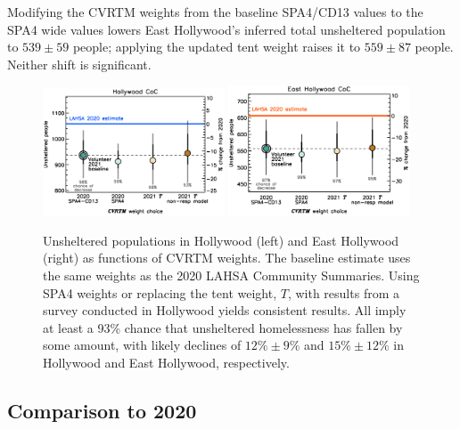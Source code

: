 \documentclass[11pt,twocolumn]{article}
\def\resp{respectively}
\begin{document}
Modifying the CVRTM weights from the baseline SPA4/CD13 values to the SPA4 wide values 
lowers East Hollywood's inferred total unsheltered population to $539\pm59$ people; applying
the updated tent weight raises it to $559\pm87$ people. Neither shift is significant.

\begin{figure}[]
	\centering
	\includegraphics[width = 0.48\textwidth, trim = 0cm 0.5cm 0cm 0cm]{hwoodFinal}
	\includegraphics[width = 0.48\textwidth, trim = 0cm 0.5cm 0cm 0cm]{ehoFinal}	
	\caption{Unsheltered populations in Hollywood (left) and East Hollywood (right) 
			as functions of CVRTM weights. The baseline estimate uses the same weights as the 
			2020 LAHSA Community Summaries. Using SPA4 weights or replacing the tent 
			weight, $T$, with results from a survey conducted in Hollywood yields consistent
			results. All imply at least a 93\% chance that unsheltered homelessness has fallen
			by some amount, with likely declines of $12\%\pm9\%$ and $15\%\pm12\%$
			in Hollywood and East Hollywood, \resp.}
	\label{fig:wtComp}
\end{figure}



\subsection{Comparison to 2020}
\label{sec:comp}
\end{document}
